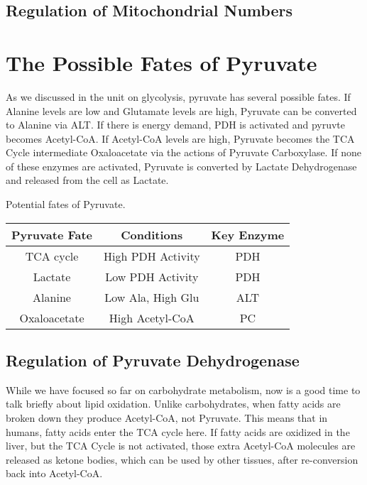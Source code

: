 \documentclass{tufte-handout}
\begin{document}
\subsection{Regulation of Mitochondrial Numbers}

\section{The Possible Fates of Pyruvate}

As we discussed in the unit on glycolysis, pyruvate has several possible fates.  If Alanine levels are low and Glutamate levels are high, Pyruvate can be converted to Alanine via ALT.  If there is energy demand, PDH is activated and pyruvte becomes Acetyl-CoA.  If Acetyl-CoA levels are high, Pyruvate becomes the TCA Cycle intermediate Oxaloacetate via the actions of Pyruvate Carboxylase.  If none of these enzymes are activated, Pyruvate is converted by Lactate Dehydrogenase and released from the cell as Lactate.

\begin{margintable}
\centering
\caption{Potential fates of Pyruvate.}
\label{tab:pyruvate-fates}
\begin{tabular}{ccc}
\hline
\textbf {Pyruvate Fate} & \textbf{Conditions}  & \textbf{Key Enzyme} \\
\hline
TCA cycle & High PDH Activity & PDH \\
Lactate & Low PDH Activity & PDH \\
Alanine & Low Ala, High Glu & ALT\\
Oxaloacetate & High Acetyl-CoA & PC \\
\hline
\end{tabular}
\end{margintable}


\subsection{Regulation of Pyruvate Dehydrogenase}

  While we have focused so far on carbohydrate metabolism, now is a good time to talk briefly about lipid oxidation.  Unlike carbohydrates, when fatty acids are broken down they produce Acetyl-CoA, not Pyruvate.  This means that in humans, fatty acids enter the TCA cycle here.  If fatty acids are oxidized in the liver, but the TCA Cycle is not activated, those extra Acetyl-CoA molecules are released as ketone bodies, which can be used by other tissues, after re-conversion back into Acetyl-CoA.
\end{document}
